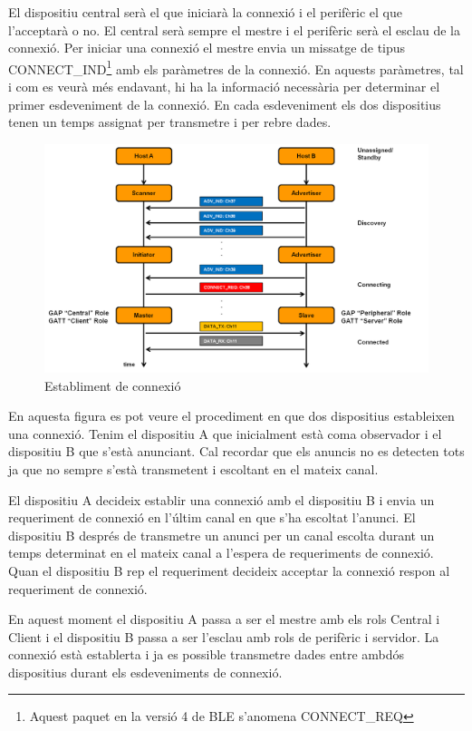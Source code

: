 El dispositiu central serà el que iniciarà la connexió i el perifèric el que l'acceptarà o no.
El central serà sempre el mestre i el perifèric serà el esclau de la connexió.
Per iniciar una connexió el mestre envia un missatge de tipus CONNECT\_IND\footnote{Aquest paquet en la versió 4 de BLE s'anomena CONNECT\_REQ} amb els paràmetres de la connexió.
En aquests paràmetres, tal i com es veurà més endavant, hi ha la informació necessària per determinar el primer esdeveniment de la connexió.
En cada esdeveniment els dos dispositius tenen un temps assignat per transmetre i per rebre dades.

\begin{figure}[h]
	\begin{center}
		\includegraphics[width=1\textwidth]{./images/rols_unicast.png}
		\caption{Establiment de connexió}
	\end{center}
\end{figure}


En aquesta figura es pot veure el procediment en que dos dispositius estableixen una connexió.
Tenim el dispositiu A que inicialment està coma observador i el dispositiu B que s'està anunciant.
Cal recordar que els anuncis no es detecten tots ja que no sempre s'està transmetent i escoltant en el mateix canal.

El dispositiu A decideix establir una connexió amb el dispositiu B i envia un requeriment de connexió en l'últim canal en que s'ha escoltat l'anunci.
El dispositiu B després de transmetre un anunci per un canal escolta durant un temps determinat en el mateix canal a l'espera de requeriments de connexió.
Quan el dispositiu B rep el requeriment decideix acceptar la connexió respon al requeriment de connexió.

En aquest moment el dispositiu A passa a ser el mestre amb els rols Central i Client i el dispositiu B passa a ser l'esclau amb rols de perifèric i servidor.
La connexió està establerta i ja es possible transmetre dades entre ambdós dispositius durant els esdeveniments de connexió. 


